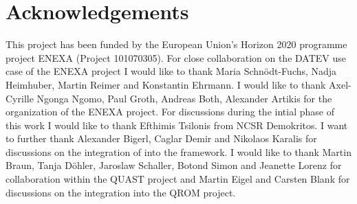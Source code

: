 \chapter{Acknowledgements}

This project has been funded by the European Union's Horizon 2020 programme project ENEXA (Project 101070305).
For close collaboration on the DATEV use case of the ENEXA project I would like to thank Maria Schnödt-Fuchs, Nadja Heimhuber, Martin Reimer and Konstantin Ehrmann.
I would like to thank Axel-Cyrille Ngonga Ngomo, Paul Groth, Andreas Both, Alexander Artikis for the organization of the ENEXA project.
For discussions during the intial phase of this work I would like to thank Efthimis Tsilonis from NCSR Demokritos.
I want to further thank Alexander Bigerl, Caglar Demir and Nikolaos Karalis for discussions on the integration of  into the \tnreason{} framework.
I would like to thank Martin Braun, Tanja Döhler, Jaroslaw Schaller, Botond Simon and Jeanette Lorenz for collaboration within the QUAST project and
Martin Eigel and Carsten Blank for discussions on the integration into the QROM project.
